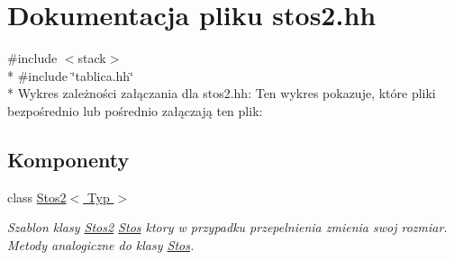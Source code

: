 \hypertarget{stos2_8hh}{\section{Dokumentacja pliku stos2.\-hh}
\label{stos2_8hh}
}
{\ttfamily \#include $<$stack$>$}\\*
{\ttfamily \#include \char`\"{}tablica.\-hh\char`\"{}}\\*
Wykres zależności załączania dla stos2.\-hh\-:
Ten wykres pokazuje, które pliki bezpośrednio lub pośrednio załączają ten plik\-:
\subsection*{Komponenty}
\begin{DoxyCompactItemize}
\item 
class \hyperlink{class_stos2}{Stos2$<$ Typ $>$}
\begin{DoxyCompactList}\small\item\em Szablon klasy \hyperlink{class_stos2}{Stos2} \hyperlink{class_stos}{Stos} ktory w przypadku przepelnienia zmienia swoj rozmiar. Metody analogiczne do klasy \hyperlink{class_stos}{Stos}. \end{DoxyCompactList}\end{DoxyCompactItemize}

